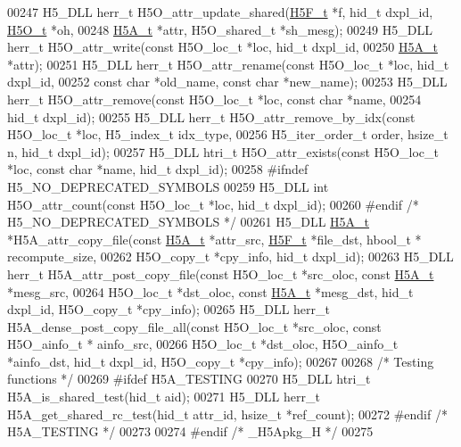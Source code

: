 \begin{DoxyCode}
00247 H5\_DLL herr\_t H5O\_attr\_update\_shared(\hyperlink{struct_h5_f__t}{H5F\_t} *f, hid\_t dxpl\_id, \hyperlink{struct_h5_o__t}{H5O\_t} *oh,
00248         \hyperlink{struct_h5_a__t}{H5A\_t} *attr, H5O\_shared\_t *sh\_mesg);
00249 H5\_DLL herr\_t H5O\_attr\_write(\textcolor{keyword}{const} H5O\_loc\_t *loc, hid\_t dxpl\_id,
00250     \hyperlink{struct_h5_a__t}{H5A\_t} *attr);
00251 H5\_DLL herr\_t H5O\_attr\_rename(\textcolor{keyword}{const} H5O\_loc\_t *loc, hid\_t dxpl\_id,
00252     \textcolor{keyword}{const} \textcolor{keywordtype}{char} *old\_name, \textcolor{keyword}{const} \textcolor{keywordtype}{char} *new\_name);
00253 H5\_DLL herr\_t H5O\_attr\_remove(\textcolor{keyword}{const} H5O\_loc\_t *loc, \textcolor{keyword}{const} \textcolor{keywordtype}{char} *name,
00254     hid\_t dxpl\_id);
00255 H5\_DLL herr\_t H5O\_attr\_remove\_by\_idx(\textcolor{keyword}{const} H5O\_loc\_t *loc, H5\_index\_t idx\_type,
00256     H5\_iter\_order\_t order, hsize\_t n, hid\_t dxpl\_id);
00257 H5\_DLL htri\_t H5O\_attr\_exists(\textcolor{keyword}{const} H5O\_loc\_t *loc, \textcolor{keyword}{const} \textcolor{keywordtype}{char} *name, hid\_t dxpl\_id);
00258 \textcolor{preprocessor}{#ifndef H5\_NO\_DEPRECATED\_SYMBOLS}
00259 H5\_DLL \textcolor{keywordtype}{int} H5O\_attr\_count(\textcolor{keyword}{const} H5O\_loc\_t *loc, hid\_t dxpl\_id);
00260 \textcolor{preprocessor}{#endif }\textcolor{comment}{/* H5\_NO\_DEPRECATED\_SYMBOLS */}\textcolor{preprocessor}{}
00261 H5\_DLL \hyperlink{struct_h5_a__t}{H5A\_t} *H5A\_attr\_copy\_file(\textcolor{keyword}{const} \hyperlink{struct_h5_a__t}{H5A\_t} *attr\_src, \hyperlink{struct_h5_f__t}{H5F\_t} *file\_dst, hbool\_t *
      recompute\_size,
00262     H5O\_copy\_t *cpy\_info, hid\_t dxpl\_id);
00263 H5\_DLL herr\_t H5A\_attr\_post\_copy\_file(\textcolor{keyword}{const} H5O\_loc\_t *src\_oloc, \textcolor{keyword}{const} \hyperlink{struct_h5_a__t}{H5A\_t} *mesg\_src,
00264     H5O\_loc\_t *dst\_oloc, \textcolor{keyword}{const} \hyperlink{struct_h5_a__t}{H5A\_t} *mesg\_dst, hid\_t dxpl\_id, H5O\_copy\_t *cpy\_info);
00265 H5\_DLL herr\_t H5A\_dense\_post\_copy\_file\_all(\textcolor{keyword}{const} H5O\_loc\_t *src\_oloc, \textcolor{keyword}{const} H5O\_ainfo\_t * ainfo\_src,
00266     H5O\_loc\_t *dst\_oloc, H5O\_ainfo\_t *ainfo\_dst, hid\_t dxpl\_id, H5O\_copy\_t *cpy\_info);
00267 
00268 \textcolor{comment}{/* Testing functions */}
00269 \textcolor{preprocessor}{#ifdef H5A\_TESTING}
00270 H5\_DLL htri\_t H5A\_is\_shared\_test(hid\_t aid);
00271 H5\_DLL herr\_t H5A\_get\_shared\_rc\_test(hid\_t attr\_id, hsize\_t *ref\_count);
00272 \textcolor{preprocessor}{#endif }\textcolor{comment}{/* H5A\_TESTING */}\textcolor{preprocessor}{}
00273 
00274 \textcolor{preprocessor}{#endif }\textcolor{comment}{/* \_H5Apkg\_H */}\textcolor{preprocessor}{}
00275 
\end{DoxyCode}
